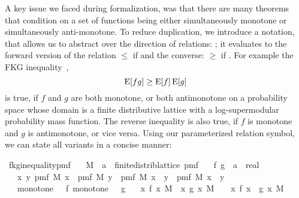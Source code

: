A key issue we faced during formalization, was that there are many theorems that condition on a set of functions being either simultaneously monotone or simultaneously anti-monotone.
To reduce duplication, we introduce a notation, that allows us to abstract over the direction of relations: \isa{\isasymle\isasymge\isactrlbsub\isasymeta\isactrlesub}; it evaluates to the forward version of the relation $\leq$ if  and the converse: $\geq$ if .
For example the FKG inequality~\cite[Ch. 6]{alon2000},\cite{fortuin1971}
\[
  \operatorname{\mathrm{E}} [f g] \geq \operatorname{\mathrm{E}} [f] \operatorname{\mathrm{E}} [g]
\]
is true, if $f$ and $g$ are both monotone, or both antimonotone on a probability space whose domain is a finite distributive lattice with a log-supermodular probability mass function.
The reverse inequality is also true, if $f$ is monotone and $g$ is antimonotone, or vice versa.
Using our parameterized relation symbol, we can state all variants in a concise manner:
\begin{isabelle_cm}
\isamarkupfalse%
\ fkg{\isacharunderscore}{\kern0pt}inequality{\isacharunderscore}{\kern0pt}pmf{\isacharcolon}{\kern0pt}\isanewline
\ \ \ M\ {\isacharcolon}{\kern0pt}{\isacharcolon}{\kern0pt}\ {\isacartoucheopen}{\isacharparenleft}{\kern0pt}{\isacharprime}{\kern0pt}a\ {\isacharcolon}{\kern0pt}{\isacharcolon}{\kern0pt}\ finite{\isacharunderscore}{\kern0pt}distrib{\isacharunderscore}{\kern0pt}lattice{\isacharparenright}{\kern0pt}\ pmf{\isacartoucheclose}\isanewline
\ \ \ f\ g\ {\isacharcolon}{\kern0pt}{\isacharcolon}{\kern0pt}\ {\isacartoucheopen}{\isacharprime}{\kern0pt}a\ {\isasymRightarrow}\ real{\isacartoucheclose}\isanewline
\ \ \ {\isacartoucheopen}{\isasymAnd}x\ y{\isachardot}{\kern0pt}\ pmf\ M\ x\ {\isacharasterisk}{\kern0pt}\ pmf\ M\ y\ {\isasymle}\ pmf\ M\ {\isacharparenleft}{\kern0pt}x\ {\isasymsqunion}\ y{\isacharparenright}{\kern0pt}\ {\isacharasterisk}{\kern0pt}\ pmf\ M\ {\isacharparenleft}{\kern0pt}x\ {\isasymsqinter}\ y{\isacharparenright}{\kern0pt}{\isacartoucheclose}\isanewline
\ \ \ {\isacartoucheopen}monotone\ {\isacharparenleft}{\kern0pt}{\isasymle}{\isacharparenright}{\kern0pt}\ {\isacharparenleft}{\kern0pt}{\isasymle}{\isasymge}\isactrlbsub {\isasymtau}\isactrlesub {\isacharparenright}{\kern0pt}\ f{\isacartoucheclose}\ {\isacartoucheopen}monotone\ {\isacharparenleft}{\kern0pt}{\isasymle}{\isacharparenright}{\kern0pt}\ {\isacharparenleft}{\kern0pt}{\isasymle}{\isasymge}\isactrlbsub {\isasymsigma}\isactrlesub {\isacharparenright}{\kern0pt}\ g{\isacartoucheclose}\isanewline
\ \ \ {\isacartoucheopen}{\isacharparenleft}{\kern0pt}{\isasymintegral}x{\isachardot}{\kern0pt}\ f\ x\ {\isasympartial}M{\isacharparenright}{\kern0pt}\ {\isacharasterisk}{\kern0pt}\ {\isacharparenleft}{\kern0pt}{\isasymintegral}x{\isachardot}{\kern0pt}\ g\ x\ {\isasympartial}M{\isacharparenright}{\kern0pt}\ {\isasymle}{\isasymge}\isactrlbsub {\isasymtau}\ {\isacharasterisk}{\kern0pt}\ {\isasymsigma}\isactrlesub \ {\isacharparenleft}{\kern0pt}{\isasymintegral}x{\isachardot}{\kern0pt}\ f\ x\ {\isacharasterisk}{\kern0pt}\ g\ x\ {\isasympartial}M{\isacharparenright}{\kern0pt}{\isacartoucheclose}
\end{isabelle_cm}
